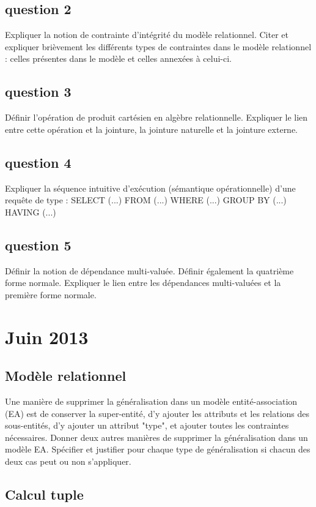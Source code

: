 \subsection{question 2}
Expliquer la notion de contrainte d’intégrité du modèle relationnel. Citer et expliquer brièvement
les différents types de contraintes dans le modèle relationnel : celles présentes dans le modèle
et celles annexées à celui-ci.

\subsection{question 3}

Définir l’opération de produit cartésien en algèbre relationnelle. Expliquer le lien entre cette
opération et la jointure, la jointure naturelle et la jointure externe.

\subsection{question 4}
Expliquer la séquence intuitive d’exécution (sémantique opérationnelle) d’une requête de type :
SELECT (...) FROM (...) WHERE (...) GROUP BY (...) HAVING (...)

\subsection{question 5}
Définir la notion de dépendance multi-valuée. Définir également la quatrième forme normale.
Expliquer le lien entre les dépendances multi-valuées et la première forme normale.


\section{Juin 2013}

\subsection{Modèle relationnel}
Une manière de supprimer la généralisation dans un modèle entité-association (EA)
est de conserver la super-entité, d'y ajouter les attributs et les relations 
des sous-entités, d'y ajouter un attribut "type", et ajouter toutes les 
contraintes nécessaires. Donner deux autres manières de supprimer la 
généralisation dans un modèle EA. Spécifier et justifier pour chaque type de généralisation 
si chacun des deux cas peut ou non s'appliquer. 

\subsection{Calcul tuple}

